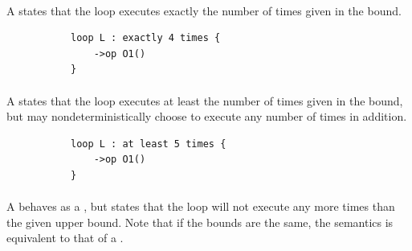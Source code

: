 \paragraph{\mdefiniteloopbound}
A \mdefiniteloopbound{} states that the loop executes exactly the
number of times given in the bound.

\begin{figure}[h!]
\begin{subfigure}[t]{\egtextwidth}
\begin{lstlisting}[style=Example]
loop L : exactly 4 times {
    ->op O1()
}
\end{lstlisting}
\end{subfigure}
\hfill
\begin{subfigure}[t]{\eggraphicalwidth}
  \gsecaption
  \centering
\end{subfigure}
\end{figure}

\paragraph{\mlowerloopbound}
A \mlowerloopbound{} states that the loop executes at least the
number of times given in the bound, but may nondeterministically
choose to execute any number of times in addition.

\begin{figure}[h!]
\begin{subfigure}[t]{\egtextwidth}
\begin{lstlisting}[style=Example]
loop L : at least 5 times {
    ->op O1()
}
\end{lstlisting}
\end{subfigure}
\hfill
\begin{subfigure}[t]{\eggraphicalwidth}
  \gsecaption
  \centering
\end{subfigure}
\end{figure}

\paragraph{\mrangeloopbound}
A \mrangeloopbound{} behaves as a \mlowerloopbound, but states that
the loop will not execute any more times than the given upper bound.
Note that if the bounds are the same, the semantics is equivalent
to that of a \mdefiniteloopbound{}.

